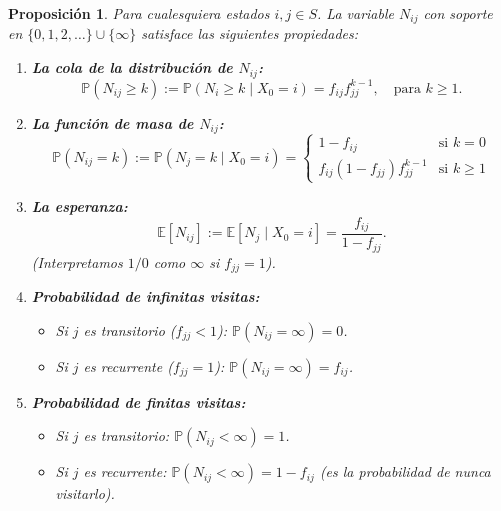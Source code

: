 \documentclass[12pt]{book}
\newtheorem{proposition}{Proposición}[chapter]
\begin{document}
\begin{proposition}
Para cualesquiera estados $i, j \in S$. La variable $N_{ij}$ con soporte en $\{0, 1, 2, \dots\} \cup \{\infty\}$ satisface las siguientes propiedades:
\begin{enumerate}
    \item \textbf{La cola de la distribución de $N_{ij}$:} 
    \[  \mathbb{P}(N_{ij} \ge k):=\mathbb{P}(N_{i} \ge k \mid X_0 = i) = f_{ij} f_{jj}^{k-1}, \quad \text{para } k \ge 1. \]
    
    \item \textbf{La función de masa de $N_{ij}$:}
    \[
    \mathbb{P}(N_{ij}=k):=\mathbb{P}(N_{j} = k \mid X_0 = i) =
    \begin{cases}
    1 - f_{ij} & \text{si } k=0 \\
    f_{ij} (1-f_{jj}) f_{jj}^{k-1} & \text{si } k \ge 1
    \end{cases}
    \]
    
    \item \textbf{La esperanza:}
    \[
    \mathbb{E}[N_{ij}]:=\mathbb{E}[N_{j} \mid X_0 = i] = \frac{f_{ij}}{1 - f_{jj}}.
    \]
    (Interpretamos $1/0$ como $\infty$ si $f_{jj}=1$).
    
    \item \textbf{Probabilidad de infinitas visitas:}
    \begin{itemize}
        \item Si $j$ es transitorio ($f_{jj} < 1$): $\mathbb{P}(N_{ij} = \infty) = 0$.
        \item Si $j$ es recurrente ($f_{jj} = 1$): $\mathbb{P}(N_{ij} = \infty) = f_{ij}$.
    \end{itemize}
    
    \item \textbf{Probabilidad de finitas visitas:}
    \begin{itemize}
        \item Si $j$ es transitorio: $\mathbb{P}(N_{ij} < \infty) = 1$.
        \item Si $j$ es recurrente: $\mathbb{P}(N_{ij} < \infty) = 1 - f_{ij}$ (es la probabilidad de nunca visitarlo).
    \end{itemize}
\end{enumerate}
\end{proposition}
\end{document}
